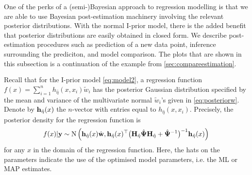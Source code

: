 One of the perks of a (semi-)Bayesian approach to regression modelling is that we are able to use Bayesian post-estimation machinery involving the relevant posterior distributions.
With the normal I-prior model, there is the added benefit that posterior distributions are easily obtained in closed form.
We describe post-estimation procedures such as prediction of a new data point, inference surrounding the prediciton, and model comparison.
The plots that are shown in this subsection is a continuation of the example from \cref{sec:compareestimation}.

Recall that for the I-prior model \cref{eq:model2}, a regression function $f(x) = \sum_{i=1}^n h_{\hat\eta}(x,x_i)\tilde w_i$
has the posterior Gaussian distribution specified by the mean and variance of the multivariate normal $\tilde w_i$'s given in \cref{eq:posteriorw}.
Denote by ${\mathbf h}_{\hat\eta}(x)$ the $n$-vector with entries equal to $h_{\hat\eta}(x,x_i)$.
Precisely, the posterior density for the regression function is
\begin{align}
  f(x) | {\mathbf y} \sim \operatorname{N} \Big( 
  {\mathbf h}_{\hat\eta}(x)\hat{{\mathbf w}}, 
  {\mathbf h}_{\hat\eta}(x)^\top \big({\mathbf H}_{\hat\eta}\hat{{\bm\Psi}}{\mathbf H}_{\hat\eta} + \hat{{\bm\Psi}}^{-1}\big)^{-1} {\mathbf h}_{\hat\eta}(x) 
  \Big)
\end{align}
for any $x$ in the domain of the regression function.
Here, the hats on the parameters indicate the use of the optimised model parameters, i.e. the ML or MAP estimates.

